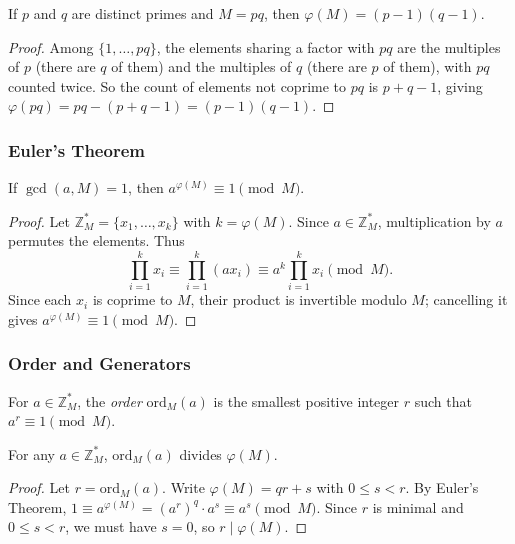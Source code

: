 \begin{theorem}
\label{thm:totient-pq}
If $p$ and $q$ are distinct primes and $M = pq$, then $\varphi(M) = (p-1)(q-1)$.
\end{theorem}
\begin{proof}
Among $\{1,\dots,pq\}$, the elements sharing a factor with $pq$ are the multiples of $p$ (there are $q$ of them) and the multiples of $q$ (there are $p$ of them), with $pq$ counted twice. So the count of elements not coprime to $pq$ is $p+q-1$, giving $\varphi(pq) = pq - (p+q-1) = (p-1)(q-1)$.
\end{proof}

\subsubsection{Euler's Theorem}

\begin{theorem}
\label{thm:euler}
If $\gcd(a,M)=1$, then $a^{\varphi(M)} \equiv 1 \pmod{M}$.
\end{theorem}
\begin{proof}
Let $\mathbb{Z}_M^* = \{x_1,\dots,x_k\}$ with $k=\varphi(M)$. Since $a \in \mathbb{Z}_M^*$, multiplication by $a$ permutes the elements. Thus
\[
    \prod_{i=1}^k x_i \equiv \prod_{i=1}^k (ax_i) \equiv a^k \prod_{i=1}^k x_i \pmod{M}.
\]
Since each $x_i$ is coprime to $M$, their product is invertible modulo $M$; cancelling it gives $a^{\varphi(M)} \equiv 1 \pmod{M}$.
\end{proof}

\subsubsection{Order and Generators}

\begin{definition}
\label{def:order}
For $a \in \mathbb{Z}_M^*$, the \emph{order} $\mathrm{ord}_M(a)$ is the smallest positive integer $r$ such that $a^r \equiv 1 \pmod{M}$.
\end{definition}

\begin{lemma}
\label{lem:order-divides}
For any $a \in \mathbb{Z}_M^*$, $\mathrm{ord}_M(a)$ divides $\varphi(M)$.
\end{lemma}
\begin{proof}
Let $r = \mathrm{ord}_M(a)$. Write $\varphi(M) = qr + s$ with $0 \leq s < r$. By Euler's Theorem, $1 \equiv a^{\varphi(M)} = (a^r)^q \cdot a^s \equiv a^s \pmod{M}$. Since $r$ is minimal and $0 \leq s < r$, we must have $s=0$, so $r \mid \varphi(M)$.
\end{proof}

